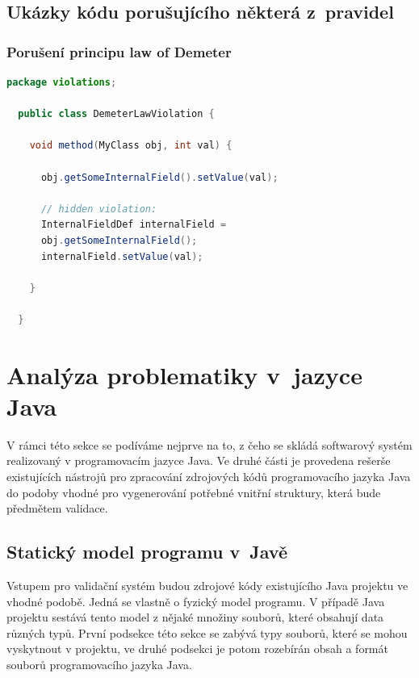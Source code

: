 \subsection{Ukázky kódu porušujícího některá z~pravidel}

\subsubsection{Porušení principu law of Demeter}

\begin{lstlisting}[language=java]
  package violations;

  public class DemeterLawViolation {

    void method(MyClass obj, int val) {

      obj.getSomeInternalField().setValue(val);

      // hidden violation:
      InternalFieldDef internalField =
      obj.getSomeInternalField();
      internalField.setValue(val);

    }

  }
\end{lstlisting}

\section{Analýza problematiky v~jazyce Java}

V rámci této sekce se podíváme nejprve na to, z čeho se skládá softwarový systém realizovaný v programovacím jazyce Java. Ve druhé části je provedena rešerše existujících nástrojů pro zpracování zdrojových kódů programovacího jazyka Java do podoby vhodné pro vygenerování potřebné vnitřní struktury, která bude předmětem validace.

\subsection{Statický model programu v~Javě}
Vstupem pro validační systém budou zdrojové kódy existujícího Java projektu ve vhodné podobě. Jedná se vlastně o fyzický model programu. V případě Java projektu sestává tento model z nějaké množiny souborů, které obsahují data různých typů. První podsekce této sekce se zabývá typy souborů, které se mohou vyskytnout v projektu, ve druhé podsekci je potom rozebírán obsah a formát souborů programovacího jazyka Java.


